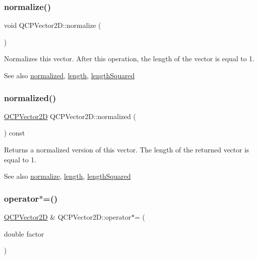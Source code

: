 \subsubsection{\texorpdfstring{normalize()}{normalize()}}
{\footnotesize\ttfamily void Q\+C\+P\+Vector2\+D\+::normalize (\begin{DoxyParamCaption}{ }\end{DoxyParamCaption})}

Normalizes this vector. After this operation, the length of the vector is equal to 1.

\begin{DoxySeeAlso}{See also}
\hyperlink{class_q_c_p_vector2_d_a707bb3af3b1f9331a2450ec75eaf7eb0}{normalized}, \hyperlink{class_q_c_p_vector2_d_a10adb5ab031fe94f0b64a3c5aefb552e}{length}, \hyperlink{class_q_c_p_vector2_d_a766585459d84cb149334fda1a498b2e5}{length\+Squared} 
\end{DoxySeeAlso}
\mbox{\label{class_q_c_p_vector2_d_a707bb3af3b1f9331a2450ec75eaf7eb0}} 
\subsubsection{\texorpdfstring{normalized()}{normalized()}}
{\footnotesize\ttfamily \hyperlink{class_q_c_p_vector2_d}{Q\+C\+P\+Vector2D} Q\+C\+P\+Vector2\+D\+::normalized (\begin{DoxyParamCaption}{ }\end{DoxyParamCaption}) const}

Returns a normalized version of this vector. The length of the returned vector is equal to 1.

\begin{DoxySeeAlso}{See also}
\hyperlink{class_q_c_p_vector2_d_ad83268be370685c2a0630acc0fb1a425}{normalize}, \hyperlink{class_q_c_p_vector2_d_a10adb5ab031fe94f0b64a3c5aefb552e}{length}, \hyperlink{class_q_c_p_vector2_d_a766585459d84cb149334fda1a498b2e5}{length\+Squared} 
\end{DoxySeeAlso}
\mbox{\label{class_q_c_p_vector2_d_aa52a246d168f475a4231c7bdfdac7df1}} 
\subsubsection{\texorpdfstring{operator$\ast$=()}{operator*=()}}
{\footnotesize\ttfamily \hyperlink{class_q_c_p_vector2_d}{Q\+C\+P\+Vector2D} \& Q\+C\+P\+Vector2\+D\+::operator$\ast$= (\begin{DoxyParamCaption}\item[{double}]{factor }\end{DoxyParamCaption})}

